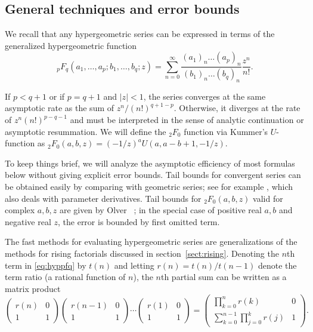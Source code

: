 \documentclass[reqno]{amsart}
\theoremstyle{definition}
\begin{document}
\subsection{General techniques and error bounds}

We recall that any hypergeometric series can be expressed in terms of
the generalized hypergeometric function
\begin{equation}
{}_pF_q(a_1,\ldots,a_p;b_1,\ldots,b_q;z) =
\sum_{n=0}^\infty \frac{(a_1)_n\dots(a_p)_n}{(b_1)_n\dots(b_q)_n} \frac {z^n} {n!}.
\label{eq:hyppfq}
\end{equation}

If $p < q + 1$ or if $p = q + 1$ and $|z| < 1$,
the series converges at the same asymptotic rate
as the sum of $z^n / (n!)^{q + 1 - p}$.
Otherwise, it diverges
at the rate of $z^n (n!)^{p - q - 1}$
and must be interpreted in the sense of analytic continuation
or asymptotic resummation.
We will define the ${}_2F_0$ function
via Kummer's $U$-function as ${}_2F_0(a,b,z) = (-1/z)^a U(a, a-b+1, -1/z)$.

To keep things brief, we will analyze the asymptotic efficiency
of most formulas below without giving
explicit error bounds.
Tail bounds for convergent series can be obtained easily
by comparing with geometric series;
see for example \cite[Theorem 1]{Johansson2019hypergeometric},
which also deals with parameter derivatives.
Tail bounds for ${}_2F_0(a,b,z)$
valid for complex $a,b,z$ are given by
Olver~\cite[section 13.7]{DLMF} \cite{Olver1965};
in the special case of positive real $a, b$ and negative real $z$,
the error is bounded by first omitted term.

The fast methods for evaluating hypergeometric series are
generalizations of the methods for rising factorials discussed in section~\ref{sect:rising}.
Denoting the $n$th term in \eqref{eq:hyppfq} by $t(n)$ and letting $r(n) = t(n) / t(n-1)$
denote the term ratio (a rational function of $n$), the $n$th partial sum
can be written as a matrix product
\begin{equation}
\begin{pmatrix} r(n) & 0 \\ 1 & 1 \end{pmatrix}
\begin{pmatrix} r(n-1) & 0 \\ 1 & 1 \end{pmatrix}
\cdots
\begin{pmatrix} r(1) & 0 \\ 1 & 1 \end{pmatrix}
=
\begin{pmatrix} \prod_{k=0}^{n} r(k) & 0 \\ \sum_{k=0}^{n-1} \prod_{j=0}^k r(j) & 1 \end{pmatrix}.
\end{equation}
\end{document}
